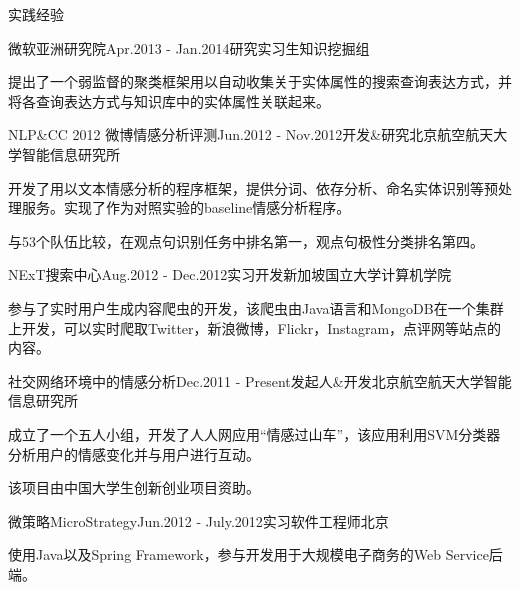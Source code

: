 \documentclass{resume} %
\begin{document}
\begin{rSection}{实践经验}

\begin{rSubsection}{微软亚洲研究院}{Apr.2013 - Jan.2014}{研究实习生}{知识挖掘组}
\item 提出了一个弱监督的聚类框架用以自动收集关于实体属性的搜索查询表达方式，并将各查询表达方式与知识库中的实体属性关联起来。
\end{rSubsection}

\begin{rSubsection}{NLP\&CC 2012 微博情感分析评测}{Jun.2012 - Nov.2012}{开发\&研究}{北京航空航天大学智能信息研究所}
\item 开发了用以文本情感分析的程序框架，提供分词、依存分析、命名实体识别等预处理服务。实现了作为对照实验的baseline情感分析程序。
\item 与53个队伍比较，在观点句识别任务中排名第一，观点句极性分类排名第四。
\end{rSubsection}


\begin{rSubsection}{NExT搜索中心}{Aug.2012 - Dec.2012}{实习开发}{新加坡国立大学计算机学院}
\item 参与了实时用户生成内容爬虫的开发，该爬虫由Java语言和MongoDB在一个集群上开发，可以实时爬取Twitter，新浪微博，Flickr，Instagram，点评网等站点的内容。
\end{rSubsection}


\begin{rSubsection}{社交网络环境中的情感分析}{Dec.2011 - Present}{发起人\&开发}{北京航空航天大学智能信息研究所}
\item 成立了一个五人小组，开发了人人网应用“情感过山车”，该应用利用SVM分类器分析用户的情感变化并与用户进行互动。
\item 该项目由中国大学生创新创业项目资助。
\end{rSubsection}


\begin{rSubsection}{微策略MicroStrategy}{Jun.2012 - July.2012}{实习软件工程师}{北京}
\item 使用Java以及Spring Framework，参与开发用于大规模电子商务的Web Service后端。
\end{rSubsection}

\end{rSection}
\end{document}

